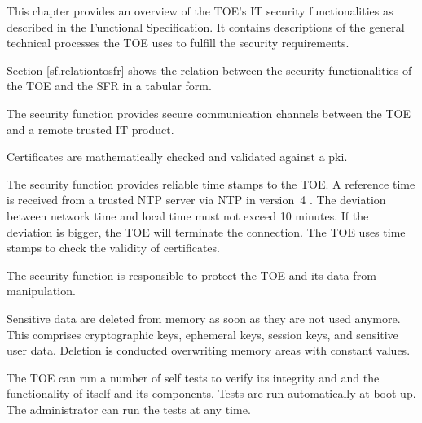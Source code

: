 
This chapter provides an overview of the TOE's IT security functionalities as
described in the Functional Specification. It contains descriptions of the
general technical processes the TOE uses to fulfill the security requirements.

Section \hyperref[sf.relationtosfr]{\ref*{sf.relationtosfr}} shows the relation
between the security functionalities of the TOE and the SFR in a tabular form.
 

The security function  provides secure communication channels
between the TOE and a remote trusted IT product.


Certificates are mathematically checked and validated against a \gls{pki}.



The security function  provides reliable time stamps
to the TOE. A reference time is received from a trusted NTP server via NTP in
version~4 \cite{rfc5905}. The deviation between network time and local time must
not exceed 10 minutes. If the deviation is bigger, the TOE will terminate the
connection. The TOE uses time stamps to check the validity of certificates.



The security function  is responsible to protect the
TOE and its data from manipulation.

Sensitive data are deleted from memory as soon as they are not used
anymore. This comprises cryptographic keys, ephemeral keys, session keys, and
sensitive user data. Deletion is conducted overwriting memory areas with
constant values.


The TOE can run a number of self tests to verify its integrity and and the
functionality of itself and its components. Tests are run automatically at boot
up. The administrator can run the tests at any time.

